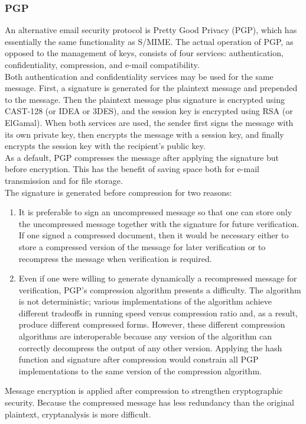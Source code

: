 \documentclass[12pt]{article}
\begin{document}
 \subsubsection{PGP}
 An alternative email security protocol is Pretty Good Privacy (PGP), which has essentially the same functionality as S/MIME. The actual operation of PGP, as opposed to the management of keys, consists of four services: authentication, confidentiality, compression, and e-mail compatibility.\\
 Both authentication and confidentiality services may be used for the same message. First, a signature is generated for the plaintext message and prepended to the message. Then the plaintext message plus signature is encrypted using CAST-128 (or IDEA or 3DES), and the session key is encrypted using RSA (or ElGamal). When both services are used, the sender first signs the message with its own private key, then encrypts the message with a session key,
 and finally encrypts the session key with the recipient’s public key.\\
 As a default, PGP compresses the message after applying the signature but before encryption. This has the benefit of saving space both for e-mail transmission and for file storage.\\
 The signature is generated before compression for two reasons:
 \begin{enumerate}
 	\item It is preferable to sign an uncompressed message so that one can store only the uncompressed message together with the signature for future verification. If one signed a compressed document, then it would be necessary either to store a compressed version of the message for later verification or to recompress the message when verification is required.
 	\item Even if one were willing to generate dynamically a recompressed message for verification, PGP’s compression algorithm presents a difficulty. The algorithm is not deterministic; various implementations of the algorithm achieve different tradeoffs in running speed versus compression ratio and, as a result, produce different compressed forms. However, these different compression algorithms are interoperable because any version of the algorithm can correctly decompress the output of any other version. Applying the hash function and signature after compression would constrain all PGP implementations to the same version of the compression algorithm.
 \end{enumerate}
 Message encryption is applied after compression to strengthen cryptographic security. Because the compressed message has less redundancy than the original plaintext, cryptanalysis is more difficult.\\
\end{document}
